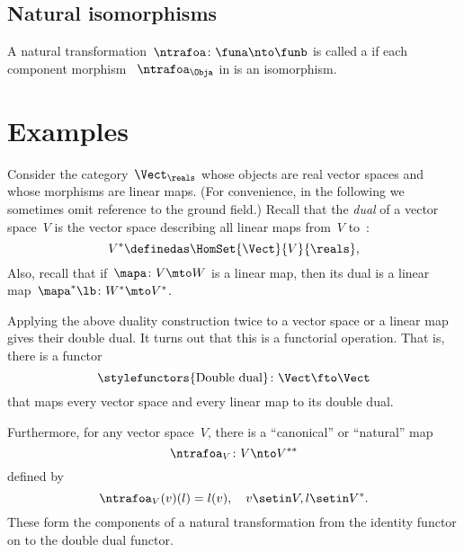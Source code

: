 \subsection{Natural isomorphisms}

\begin{ctdefinition}
    \label{def:nat_iso}
    A natural transformation~$\ntrafoa \colon \funa \nto \funb $ is called a \emph{} if each component morphism ~$\ntrafoa_\Obja$ in \CatD is an isomorphism.
\end{ctdefinition}
\clearpage

\section{Examples}



\begin{example}
    \label{ex:Vect}
    Consider the category~$\Vect_{\reals}$ whose objects are real vector spaces and whose morphisms are linear maps.
    (For convenience, in the following we sometimes omit reference to the ground field.)
    Recall that the \emph{dual} of a vector space~$V$ is the vector space describing all linear maps from~$V$ to~\reals:
    \begin{equation}
        \label{eq:dual-vector-space}
        V^* \definedas \HomSet{\Vect}{V}{\reals},
    \end{equation}
    Also, recall that if~$\mapa\colon V \mto W$ is a linear map, then its dual is a linear map~$\mapa^* \lb  \colon W^* \mto V^*$.

    Applying the above duality construction twice to a vector space or a linear map gives their double dual.
    It turns out that this is a functorial operation.
    That is, there is a functor
    \begin{equation}
        \label{eq:double-dual-functor}
        \text{\stylefunctors{Double dual}}\colon \Vect \fto \Vect
    \end{equation}
    that maps every vector space and every linear map to its double dual.

    Furthermore, for any vector space~$V$, there is a ``canonical'' or ``natural'' map
    \begin{equation}
        \ntrafoa_V \colon V \nto V^{**}
    \end{equation}
    defined by
    \begin{equation}
        \label{eq:natural-trafo-to-double-dual}
        \ntrafoa_V(v)(l) = l(v), \quad  v \setin V, l \setin V^*.
    \end{equation}
    These form the components of a natural transformation from the identity functor on \Vect to the double dual functor.

\end{example}

